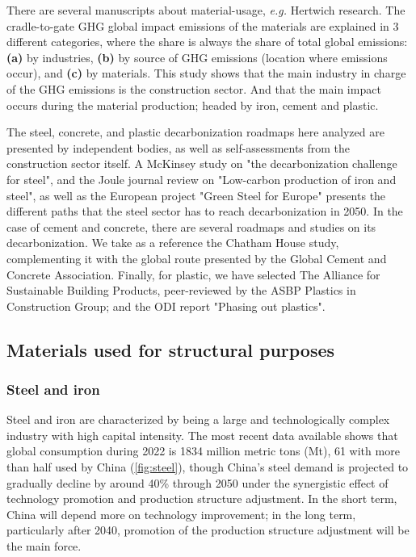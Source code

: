 There are several manuscripts about material-usage, \textit{e.g.} Hertwich research.\autocite{asbp_2020} The cradle-to-gate GHG global impact emissions of the materials are explained in 3 different categories, where the share is always the share of total global emissions: \textbf{(a)} by industries, \textbf{(b)} by source of GHG emissions (location where emissions occur), and \textbf{(c)} by materials. This study shows that the main industry in charge of the GHG emissions is the construction sector. And that the main impact occurs during the material production; headed by iron, cement and plastic.

The steel, concrete, and plastic decarbonization roadmaps here analyzed are presented by independent bodies, as well as self-assessments from the construction sector itself. A McKinsey study on "the decarbonization challenge for steel",\autocite{hoffmann2021decarbonization} and the Joule journal review on "Low-carbon production of iron and steel"\autocite{fan2021low}, as well as the European project "Green Steel for Europe"\autocite{elkerbout2021impact} presents the different paths that the steel sector has to reach decarbonization in 2050. In the case of cement and concrete, there are several roadmaps and studies on its decarbonization. We take as a reference the Chatham House study,\autocite{lehne2018making} complementing it with the global route presented by the Global Cement and Concrete Association.\autocite{cement2021concrete} Finally, for plastic, we have selected The Alliance for Sustainable Building Products, peer-reviewed by the ASBP Plastics in Construction Group;\autocite{asbp_2020} and the ODI report "Phasing out plastics".\autocite{pickard2020phasing}

\subsection{Materials used for structural purposes}
\label{sec:materials_used_for_structural_purposes}

\subsubsection{Steel and iron}
\label{sec:steel_and_iron}

Steel and iron are characterized by being a large and technologically complex industry with high capital intensity. The most recent data available shows that global consumption during 2022 is 1834 million metric tons (Mt), 61 with more than half used by China (\autoref{fig:steel}), though China’s steel demand is projected to gradually decline by around 40\% through 2050\autocite{rissman2020technologies} under the synergistic effect of technology promotion and production structure adjustment. In the short term, China will depend more on technology improvement; in the long term, particularly after 2040, promotion of the production structure adjustment will be the main force.\autocite{zhang2018comprehensive}

